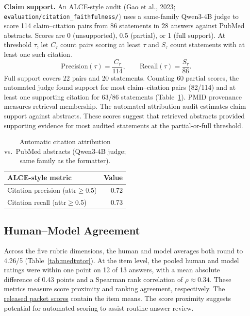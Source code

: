 \documentclass[11pt]{article}
\begin{document}
\textbf{Claim support.} An ALCE-style audit (Gao et al., 2023; \nolinkurl{evaluation/citation_faithfulness/}) uses a same-family Qwen3-4B judge to score 114 claim--citation pairs from 86 statements in 28 answers against PubMed abstracts. Scores are 0 (unsupported), 0.5 (partial), or 1 (full support). At threshold $\tau$, let $C_\tau$ count pairs scoring at least $\tau$ and $S_\tau$ count statements with at least one such citation.
\[
\mathrm{Precision}(\tau)=\frac{C_\tau}{114},\qquad
\mathrm{Recall}(\tau)=\frac{S_\tau}{86}.
\]
Full support covers 22 pairs and 20 statements. Counting 60 partial scores, the automated judge found support for most claim--citation pairs (82/114) and at least one supporting citation for 63/86 statements (Table~\ref{tab:cite}). PMID provenance measures retrieval membership. The automated attribution audit estimates claim support against abstracts. These scores suggest that retrieved abstracts provided supporting evidence for most audited statements at the partial-or-full threshold.

\begin{table}[t]\centering\small\setlength{\tabcolsep}{4pt}
\begin{tabularx}{\columnwidth}{@{}Xr@{}}\toprule
\textbf{ALCE-style metric} & \textbf{Value}\\\midrule
Citation precision (attr$\geq$0.5) & 0.72\\
Citation recall (attr$\geq$0.5) & 0.73\\
\bottomrule\end{tabularx}
\caption{Automatic citation attribution vs.\ PubMed abstracts (Qwen3-4B judge; same family as the formatter).}\label{tab:cite}
\end{table}

\subsection{Human--Model Agreement}\label{sec:agreement}

Across the five rubric dimensions, the human and model averages both round to 4.26/5 (Table~\ref{tab:medtutor}). At the item level, the pooled human and model ratings were within one point on 12 of 13 answers, with a mean absolute difference of 0.43 points and a Spearman rank correlation of $\rho{\approx}0.34$. These metrics measure score proximity and ranking agreement, respectively. The \href{https://github.com/238Plutonium/openreview/blob/main/evaluation/packet_scores.csv}{released packet scores} contain the item means. The score proximity suggests potential for automated scoring to assist routine answer review.
\end{document}
